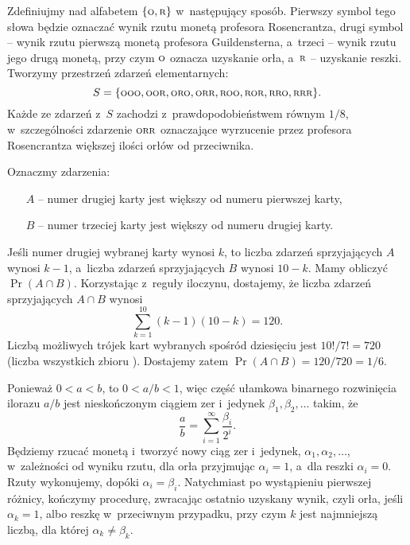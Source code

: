 \exercise %
Zdefiniujmy  nad alfabetem $\{{\scriptstyle\rm O},{\scriptstyle\rm R}\}$ w~następujący sposób. Pierwszy symbol tego słowa będzie oznaczać wynik rzutu monetą profesora Rosencrantza, drugi symbol -- wynik rzutu pierwszą monetą profesora Guildensterna, a~trzeci -- wynik rzutu jego drugą monetą, przy czym $\scriptstyle\rm O$ oznacza uzyskanie orła, a~$\scriptstyle\rm R$ -- uzyskanie reszki. Tworzymy przestrzeń zdarzeń elementarnych:
\[
	S = \{{\scriptstyle\rm OOO},{\scriptstyle\rm OOR},{\scriptstyle\rm ORO},{\scriptstyle\rm ORR},{\scriptstyle\rm ROO},{\scriptstyle\rm ROR},{\scriptstyle\rm RRO},{\scriptstyle\rm RRR}\}.
\]
Każde ze zdarzeń z~$S$ zachodzi z~prawdopodobieństwem równym $1/8$, w~szczególności zdarzenie $\scriptstyle\rm ORR$ oznaczające wyrzucenie przez profesora Rosencrantza większej ilości orłów od przeciwnika.

\exercise %
Oznaczmy zdarzenia:
\begin{itemize}
	\item[$A$] -- numer drugiej karty jest większy od numeru pierwszej karty,
	\item[$B$] -- numer trzeciej karty jest większy od numeru drugiej karty.
\end{itemize}
Jeśli numer drugiej wybranej karty wynosi $k$, to liczba zdarzeń sprzyjających $A$ wynosi $k-1$, a~liczba zdarzeń sprzyjających $B$ wynosi $10-k$. Mamy obliczyć $\Pr(A\cap B)$. Korzystając z~reguły iloczynu, dostajemy, że liczba zdarzeń sprzyjających $A\cap B$ wynosi
\[
    \sum_{k=1}^{10}(k-1)(10-k) = 120.
\]
Liczbą możliwych trójek kart wybranych spośród dziesięciu jest $10!/7!=720$ (liczba wszystkich  zbioru ). Dostajemy zatem $\Pr(A\cap B)=120/720=1/6$.

\exercise %
Ponieważ $0<a<b$, to $0<a/b<1$, więc część ułamkowa binarnego rozwinięcia ilorazu $a/b$ jest nieskończonym ciągiem zer i~jedynek $\beta_1,\beta_2,\dots$ takim, że
\[
    \frac{a}{b} = \sum_{i=1}^\infty\frac{\beta_i}{2^i}.
\]
Będziemy rzucać monetą i~tworzyć nowy ciąg zer i~jedynek, $\alpha_1,\alpha_2,\dots$, w~zależności od wyniku  rzutu, dla orła przyjmując $\alpha_i=1$, a~dla reszki $\alpha_i=0$. Rzuty wykonujemy, dopóki $\alpha_i=\beta_i$. Natychmiast po wystąpieniu pierwszej różnicy, kończymy procedurę, zwracając ostatnio uzyskany wynik, czyli orła, jeśli $\alpha_k=1$, albo reszkę w~przeciwnym przypadku, przy czym $k$ jest najmniejszą liczbą, dla której $\alpha_k\ne\beta_k$.

